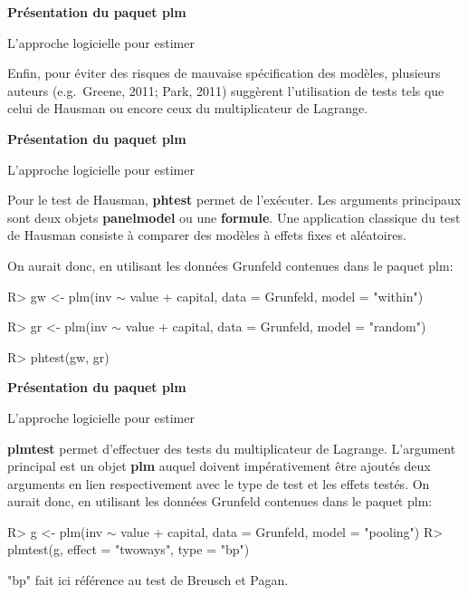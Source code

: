 \documentclass{beamer}
\begin{document}
\begin{frame}{\textbf{Pr\'esentation du paquet plm}}
\begin{block}{L'approche logicielle pour estimer}
\end{block}
Enfin, pour \'eviter des risques de mauvaise sp\'ecification des mod\`eles, plusieurs auteurs (e.g.\ Greene, 2011; Park, 2011) sugg\`erent l'utilisation de tests tels que celui de Hausman ou encore ceux du multiplicateur de Lagrange. 
\end{frame}
\begin{frame}{\textbf{Pr\'esentation du paquet plm}}
\begin{block}{L'approche logicielle pour estimer}
\end{block}
Pour le test de Hausman, \textbf{phtest} permet de l'ex\'ecuter. Les arguments principaux sont deux objets \textbf{panelmodel} ou une \textbf{formule}. Une application classique du test de Hausman consiste \`a comparer des mod\`eles \`a effets fixes et al\'eatoires. \newline

On aurait donc, en utilisant les donn\'ees Grunfeld  contenues dans le paquet plm:\newline

R> gw <- plm(inv $\sim$ value + capital, data = Grunfeld, model = "within") \newline

R> gr <- plm(inv $\sim$ value + capital, data = Grunfeld, model = "random") \newline

R> phtest(gw, gr)
\end{frame}
\begin{frame}{\textbf{Pr\'esentation du paquet plm}}
\begin{block}{L'approche logicielle pour estimer}
\end{block}
\textbf{plmtest} permet d'effectuer des tests du multiplicateur de Lagrange. L'argument principal est un objet \textbf{plm} auquel doivent imp\'erativement \^etre ajout\'es deux arguments en lien respectivement avec le type de test et les effets test\'es. On aurait donc, en utilisant les donn\'ees Grunfeld  contenues dans le paquet plm:\newline

R> g <- plm(inv $\sim$ value + capital, data = Grunfeld, model = "pooling")
R> plmtest(g, effect = "twoways", type = "bp") \newline

"bp" fait ici r\'ef\'erence au test de Breusch et Pagan. 
\end{frame}
\end{document}
